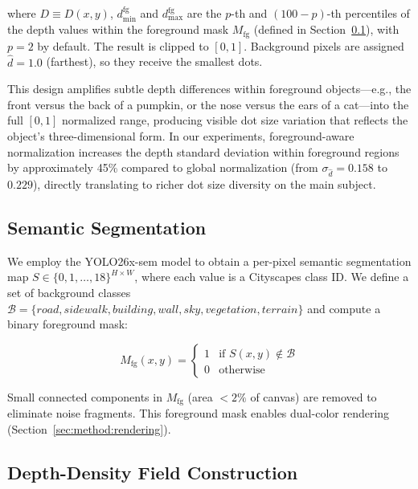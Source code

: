\noindent where $D \equiv D(x,y)$, $d_{\min}^{\text{fg}}$ and $d_{\max}^{\text{fg}}$ are
the $p$-th and $(100{-}p)$-th percentiles of the depth values within
the foreground mask $M_{\text{fg}}$ (defined in
Section~\ref{sec:method:seg}), with $p = 2$ by default. The result is
clipped to $[0, 1]$. Background
pixels are assigned $\hat{d} = 1.0$ (farthest), so they receive the
smallest dots.

This design amplifies subtle depth differences within foreground
objects---e.g., the front versus the back of a pumpkin, or the nose
versus the ears of a cat---into the full $[0, 1]$ normalized range,
producing visible dot size variation that reflects the object's
three-dimensional form. In our experiments, foreground-aware
normalization increases the depth standard deviation within
foreground regions by approximately 45\% compared to global
normalization (from $\sigma_{\hat{d}} = 0.158$ to $0.229$), directly
translating to richer dot size diversity on the main subject.

\subsection{Semantic Segmentation}
\label{sec:method:seg}

We employ the YOLO26x-sem model to obtain a per-pixel semantic
segmentation map $S \in \{0, 1, \ldots, 18\}^{H \times W}$, where each
value is a Cityscapes class ID. We define a set of background classes
$\mathcal{B} = \{\textit{road}, \textit{sidewalk}, \textit{building},
\textit{wall}, \textit{sky}, \textit{vegetation}, \textit{terrain}\}$
and compute a binary foreground mask:

\begin{equation}
    M_{\text{fg}}(x,y) = \begin{cases} 1 & \text{if } S(x,y) \notin \mathcal{B} \\ 0 & \text{otherwise} \end{cases}
    \label{eq:fg_mask}
\end{equation}

Small connected components in $M_{\text{fg}}$ (area $< 2\%$ of canvas)
are removed to eliminate noise fragments. This foreground mask enables
dual-color rendering (Section~\ref{sec:method:rendering}).

\subsection{Depth-Density Field Construction}
\label{sec:method:density}

